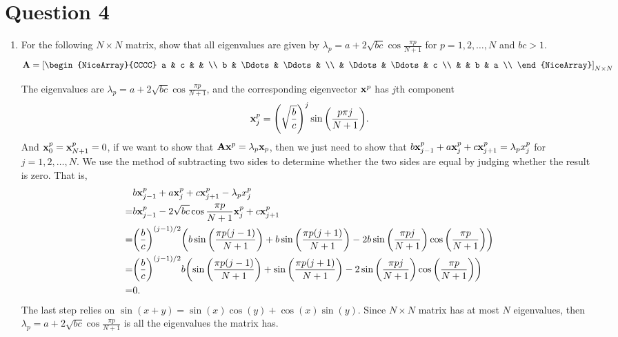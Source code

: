 \section{Question 4}\label{Q:4-1}
\begin{enumerate}[label=(\alph*)]
    \item For the following $N\times N$ matrix, show that all eigenvalues are given by $\lambda_p = a+2\sqrt{bc}\cos\tfrac{\pi p}{N+1}$ for $p=1,2,\ldots,N$ and $bc>1$.
        \[
            \mA = \qty[\begin{NiceArray}{CCCC}
                a & c      &        &   \\
                b & \Ddots & \Ddots &   \\
                  & \Ddots & \Ddots & c \\
                  &        & b      & a \\
            \end{NiceArray}]_{N\times N}
        \]
        \begin{solution}{}{}
            The eigenvalues are $\lambda_p = a+2\sqrt{bc}\cos\tfrac{\pi p}{N+1}$, and the corresponding eigenvector $\vb{x}^p$ has $j$th component
            \[
                \vb{x}^p_j = \qty(\sqrt{\frac{b}{c}})^j \sin\qty(\frac{p\pi j}{N+1}).
            \]
            And $\vb{x}^p_0=\vb{x}^p_{N+1}=0$, if we want to show that $\vb{A}\vb{x}^p=\lambda_p\vb{x}_p$, then we just need to show that $b\vb{x}^p_{j-1}+a\vb{x}^p_j+c\vb{x}^p_{j+1}=\lambda_px^p_j$ for $j=1,2,\ldots,N$. We use the method of subtracting two sides to determine whether the two sides are equal by judging whether the result is zero. That is,
            \begin{align*}
                & b\vb{x}^p_{j-1}+a\vb{x}^p_j+c\vb{x}^p_{j+1}-\lambda_px^p_j \\
                =& b\vb{x}^p_{j-1}-2\sqrt{bc}\cos\frac{\pi p}{N+1}\vb{x}^p_j+c\vb{x}^p_{j+1} \\
                =& \qty(\frac{b}{c})^{(j-1)/2}\qty(b\sin\qty(\frac{\pi p(j-1)}{N+1})+b\sin\qty(\frac{\pi p(j+1)}{N+1})-2b\sin\qty(\frac{\pi pj}{N+1})\cos\qty(\frac{\pi p}{N+1})) \\
                =& \qty(\frac{b}{c})^{(j-1)/2}b\qty(\sin\qty(\frac{\pi p(j-1)}{N+1})+\sin\qty(\frac{\pi p(j+1)}{N+1})-2\sin\qty(\frac{\pi pj}{N+1})\cos\qty(\frac{\pi p}{N+1})) \\
                =& 0.
            \end{align*}
            The last step relies on $\sin(x+y)=\sin(x)\cos(y)+\cos(x)\sin(y)$. Since $N\times N$ matrix has at most $N$ eigenvalues, then $\lambda_p = a+2\sqrt{bc}\cos\tfrac{\pi p}{N+1}$ is all the eigenvalues the matrix has.
        \end{solution}
\end{enumerate}



